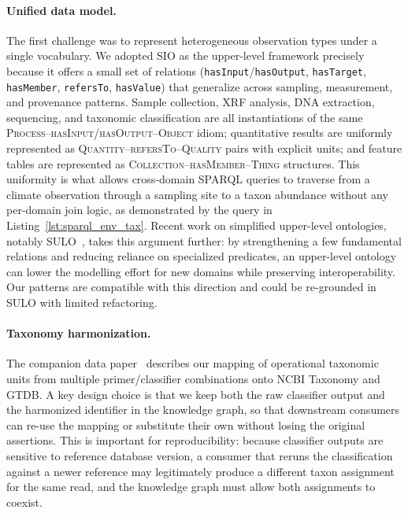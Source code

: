 \documentclass[11pt,a4paper]{article}
\begin{document}
\paragraph{Unified data model.}
The first challenge was to represent heterogeneous observation types
under a single vocabulary. We adopted SIO as the upper-level
framework precisely because it offers a small set of relations
(\texttt{hasInput}/\texttt{hasOutput}, \texttt{hasTarget},
\texttt{hasMember}, \texttt{refersTo}, \texttt{hasValue}) that
generalize across sampling, measurement, and provenance patterns.
Sample collection, XRF analysis, DNA extraction, sequencing, and
taxonomic classification are all instantiations of the same
\textsc{Process--hasInput/hasOutput--Object} idiom; quantitative
results are uniformly represented as
\textsc{Quantity--refersTo--Quality} pairs with explicit units; and
feature tables are represented as
\textsc{Collection--hasMember--Thing} structures. This uniformity is
what allows cross-domain SPARQL queries to traverse from a climate
observation through a sampling site to a taxon abundance without any
per-domain join logic, as demonstrated by the query in
Listing~\ref{lst:sparql_env_tax}. Recent work on simplified
upper-level ontologies, notably SULO~\cite{sulo2025}, takes this
argument further: by strengthening a few fundamental relations and
reducing reliance on specialized predicates, an upper-level ontology
can lower the modelling effort for new domains while preserving
interoperability. Our patterns are compatible with this direction
and could be re-grounded in SULO with limited refactoring.

\paragraph{Taxonomy harmonization.}
The companion data paper~\cite{gigascience_companion} describes our
mapping of operational taxonomic units from multiple
primer/classifier combinations onto NCBI Taxonomy and GTDB. A key
design choice is that we keep both the raw classifier output and the
harmonized identifier in the knowledge graph, so that downstream
consumers can re-use the mapping or substitute their own without
losing the original assertions. This is important for
reproducibility: because classifier outputs are sensitive to
reference database version, a consumer that reruns the classification
against a newer reference may legitimately produce a different
taxon assignment for the same read, and the knowledge graph must
allow both assignments to coexist.
\end{document}
